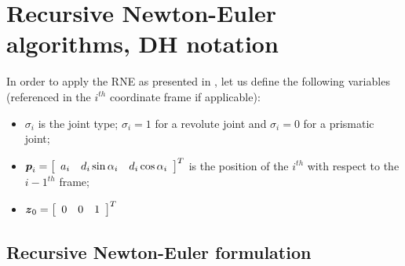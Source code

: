 
\chapter{Recursive Newton-Euler algorithms, DH notation}
\label{sec:rnea}

In order to apply the RNE as presented in \cite{Murray86}, 
let us define the following variables 
(referenced in the $i^{th}$ coordinate frame if applicable):
\begin{itemize}
\item $\sigma_i$ is the joint type; $\sigma_i = 1$ for a revolute
  joint and $\sigma_i = 0$ for a prismatic joint;
\item $\mbold{p}_i = \matr{ccc}{ a_i & d_i \sin \alpha_i & d_i \cos \alpha_i}^T$ is the
position of the $i^{th}$ with respect to the $i-1^{th}$ frame;
\item $\mbold{z}_0 = \matr{ccc}{0 & 0 & 1}^T $
\end{itemize}


\section{Recursive Newton-Euler formulation}
\label{sec:rne}

